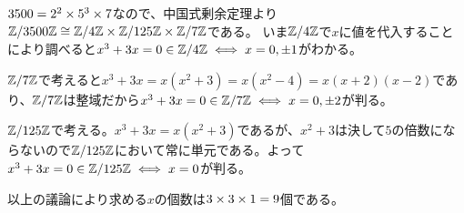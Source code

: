 
\begin{sol}
$3500 = 2^2 \times 5^3 \times 7$なので、中国式剰余定理より${\mathbb Z} / 3500 {\mathbb Z} \cong {\mathbb Z} / 4{\mathbb Z} \times {\mathbb Z} / 125 {\mathbb Z} \times {\mathbb Z} / 7{\mathbb Z}$である。
いま${\mathbb Z} / 4{\mathbb Z}$で$x$に値を代入することにより調べると$x^3 + 3x = 0 \in {\mathbb Z} / 4 {\mathbb Z} \iff x = 0, \pm 1$がわかる。

${\mathbb Z} / 7 {\mathbb Z}$で考えると$x^3 + 3x = x(x^2 + 3) = x(x^2 - 4)= x(x+2)(x-2)$であり、${\mathbb Z} / 7 {\mathbb Z}$は整域だから$x^3 + 3x = 0 \in {\mathbb Z} / 7 {\mathbb Z} \iff x = 0, \pm 2$が判る。

${\mathbb Z} / 125 {\mathbb Z}$で考える。$x^3 + 3x = x(x^2 + 3)$であるが、$x^2 + 3$は決して$5$の倍数にならないので${\mathbb Z} / 125 {\mathbb Z}$において常に単元である。よって$x^3 + 3x = 0 \in {\mathbb Z} / 125 {\mathbb Z} \iff x = 0$が判る。

以上の議論により求める$x$の個数は$3 \times 3 \times 1 = 9$個である。
\end{sol}

\newpage

